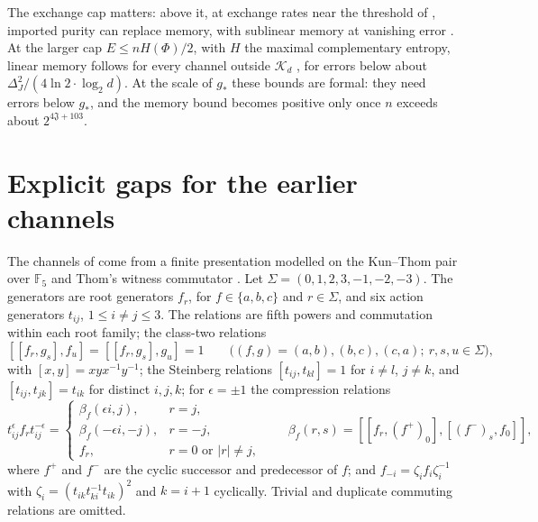 \documentclass[11pt]{article}
\newcommand{\K}{\mathcal K}
\newcommand{\cJ}{\mathfrak J}
\begin{document}
The exchange cap matters: above it, at exchange rates near the threshold of \cite[Theorem~3.4]{DouglasMghirbiCausal}, imported purity can replace memory, with sublinear memory at vanishing error \cite[Corollary~3.3(c)]{DouglasMghirbiCausal}.  At the larger cap $E\le nH(\Phi)/2$, with $H$ the maximal complementary entropy, linear memory follows for every channel outside $\K_d$ \cite[Corollary~3.3(b)]{DouglasMghirbiCausal}, for errors below about $\Delta_J^2/(4\ln2\cdot\log_2d)$.  At the scale of $g_*$ these bounds are formal: they need errors below $g_*$, and the memory bound becomes positive only once $n$ exceeds about $2^{4\cJ+103}$.

\section{Explicit gaps for the earlier channels}\label{sec:old15}

The channels of \cite{MghirbiDouglasV1} come from a finite presentation modelled on the Kun--Thom pair over $\mathbb F_5$ \cite[Theorem~E]{KunThom26} and Thom's witness commutator \cite[Section~5.2]{Thom26}.  Let $\Sigma=(0,1,2,3,-1,-2,-3)$.  The generators are root generators $f_r$, for $f\in\{a,b,c\}$ and $r\in\Sigma$, and six action generators $t_{ij}$, $1\le i\ne j\le3$.  The relations are fifth powers and commutation within each root family; the class-two relations
\begin{equation}\label{eq:classtwo}
 [[f_r,g_s],f_u]=[[f_r,g_s],g_u]=1\qquad\bigl((f,g)=(a,b),(b,c),(c,a);\ r,s,u\in\Sigma\bigr),
\end{equation}
with $[x,y]=xyx^{-1}y^{-1}$; the Steinberg relations $[t_{ij},t_{kl}]=1$ for $i\ne l$, $j\ne k$, and $[t_{ij},t_{jk}]=t_{ik}$ for distinct $i,j,k$; for $\epsilon=\pm1$ the compression relations
\begin{equation}\label{eq:compression}
 t_{ij}^{\epsilon}f_rt_{ij}^{-\epsilon}=
 \begin{cases}
 \beta_f(\epsilon i,j),&r=j,\\
 \beta_f(-\epsilon i,-j),&r=-j,\\
 f_r,&r=0\text{ or }|r|\ne j,
 \end{cases}
 \qquad \beta_f(r,s)=[[f_r,(f^+)_0],[(f^-)_s,f_0]],
\end{equation}
where $f^+$ and $f^-$ are the cyclic successor and predecessor of $f$; and $f_{-i}=\zeta_if_i\zeta_i^{-1}$ with $\zeta_i=(t_{ik}t_{ki}^{-1}t_{ik})^2$ and $k=i+1$ cyclically.  Trivial and duplicate commuting relations are omitted.
\end{document}
